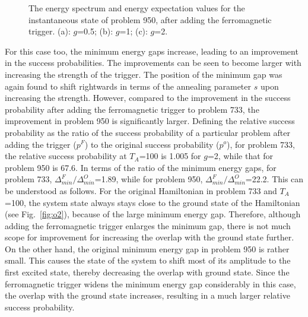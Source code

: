\documentclass[../main.tex]{subfiles}
\begin{document}
\begin{figure}
\caption{The energy spectrum and energy expectation values for the instantaneous state of problem 950, after adding the ferromagnetic trigger. (a): $g$=0.5; (b): $g$=1; (c): $g$=2.}
\label{fig:f4}
\end{figure}
For this case too, the minimum energy gaps increase, leading to an improvement in the success probabilities. The improvements can be seen to become larger with increasing the strength of the trigger. The position of the minimum gap was again found to shift rightwards in terms of the annealing parameter $s$ upon increasing the strength.
However, compared to the improvement in the success probability after adding the ferromagnetic trigger to problem 733, the improvement in problem 950 is significantly larger. Defining the relative success probability as the ratio of the success probability of a particular problem after adding the trigger ($p^F$) to the original success probability ($p^o$), for problem 733, the relative success probability at $T_A$=100 is 1.005 for $g$=2, while that for problem 950 is 67.6. In terms of the ratio of the minimum energy gaps, for problem 733, $\Delta_{min}^F/\Delta_{min}^O$=1.89, while for problem 950, $\Delta_{min}^F/\Delta_{min}^O$=22.2. This can be understood as follows. For the original Hamiltonian in problem 733 and $T_A$=100, the system state always stays close to the ground state of the Hamiltonian (see Fig.~\ref{fig:o2}), because of the large minimum energy gap. Therefore, although adding the ferromagnetic trigger enlarges the minimum gap, there is not much scope for improvement for increasing the overlap with the ground state further. On the other hand, the original minimum energy gap in problem 950 is rather small. This causes the state of the system to shift most of its amplitude to the first excited state, thereby decreasing the overlap with ground state. Since the ferromagnetic trigger widens the minimum energy gap considerably in this case, the overlap with the ground state increases, resulting in a much larger relative success probability. 
\end{document}

